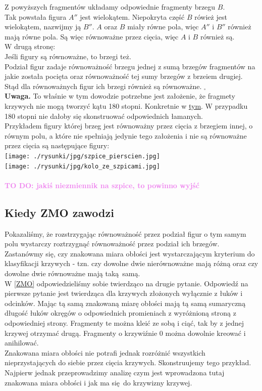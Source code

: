 \documentclass[a4paper, 12pt]{article}
\newcommand{\todo}[1]{\hfill \break \textbf{\Huge \textcolor{violet}{TO DO: #1} \hfill \break}\normalsize}
\newcommand{\rysunek}[1]{\hfill \break\\[16pt] \Huge \textbf{\textcolor{violet}{Brakujący rysunek \normalsize
#1}} \hfill
\break \\[16pt] \normalsize}
\begin{document}
Z powyższych fragmentów układamy odpowiednie fragmenty brzegu $B$. \\
Tak powstała figura $A''$ jest wielokątem. Niepokryta część $B$ rówież jest wielokątem,
nazwijmy ją $B''$. $A$ oraz $B$ miały równe pola, więc $A''$ i $B''$ również mają równe pola.
Są więc równoważne przez cięcia, więc $A$ i $B$ również są. \\[8pt]

W drugą stronę: \\
Jeśli figury są równoważne, to brzegi też. \\
Podział figur zadaje równoważność brzegu jednej z sumą brzegów fragmentów na jakie została pocięta
oraz równoważność tej sumy brzegów z brzeiem drugiej. Stąd dla równoważnych figur ich brzegi również są
równoważne.
$_\square$ \\
\textbf{Uwaga.} To właśnie w tym dowodzie potrzebne jest założenie, że fragmety krzywych nie mogą tworzyć
kątu 180 stopni. Konkretnie w \hyperref[180 stopni]{tym}. W przypadku 180 stopni nie dałoby się skonstruować
odpowiednich łamanych. \\
Przykładem figury której brzeg jest równoważny przez cięcia z brzegiem innej, o równym polu, a które nie
spełniają jedynie tego założenia i nie są równoważne przez cięcia są następujące figury: \\
\texttt{[image: ./rysunki/jpg/szpice\_pierscien.jpg]} \\
 \texttt{[image: ./rysunki/jpg/kolo\_ze\_szpicami.jpg]} \\
 \\
\todo{jakiś niezmiennik na szpice, to powinno wyjść}

\subsection{Kiedy ZMO zawodzi}
Pokazaliśmy, że rozstrzygając równoważność przez podział figur o tym samym polu wystarczy roztrzygnąć
równoważność przez podział ich brzegów. Zastanówmy się, czy znakowana miara obłości jest wystarczającym
kryterium do klasyfikacji krzywych - tzn. czy dowolne dwie nierównoważne mają różną oraz czy dowolne
dwie równoważne mają taką samą. \\
W \ref{ZMO} odpowiedzieliśmy sobie twierdząco na drugie pytanie.
Odpowiedź na pierwsze pytanie jest twierdząca dla krzywych złożonych wyłącznie z łuków i odcinków.
Mając tą samą znakowaną miarę obłości mają tą samą sumaryczną długość łuków okręgów o odpowiednich
promieniach z wyróżnioną stroną z odpowiedniej strony. Fragmenty te można kleić ze sobą i ciąć, tak by
z jednej krzywej otrzymać drugą. Fragmenty o krzywiźnie 0 można dowolnie kreować i anihilować. \\
Znakowana miara obłości nie potrafi jednak rozróżnić wszystkich nieprzystających do siebie przez cięcia
krzywych. Skonstruujemy tego przykład. Najpierw jednak przeprowadzimy analizę czym jest
wprowadzona tutaj znakowana miara obłości i jak ma się do krzywizny krzywej.
\end{document}
